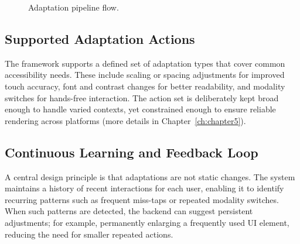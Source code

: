 \documentclass[openany]{book}
\begin{document}
\begin{figure}[h]
\centering
{}
\caption{Adaptation pipeline flow.}
\label{fig:adaptation-pipeline-flow}
\end{figure}

\subsection{Supported Adaptation Actions}
The framework supports a defined set of adaptation types that cover common accessibility needs. These include scaling or spacing adjustments for improved touch accuracy, font and contrast changes for better readability, and modality switches for hands-free interaction. The action set is deliberately kept broad enough to handle varied contexts, yet constrained enough to ensure reliable rendering across platforms (more details in Chapter~\ref{ch:chapter5}).

\subsection{Continuous Learning and Feedback Loop}
A central design principle is that adaptations are not static changes. The system maintains a history of recent interactions for each user, enabling it to identify recurring patterns such as frequent miss-taps or repeated modality switches. When such patterns are detected, the backend can suggest persistent adjustments; for example, permanently enlarging a frequently used UI element, reducing the need for smaller repeated actions.
\end{document}
